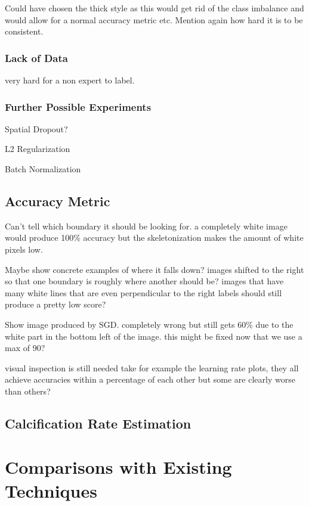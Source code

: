 Could have chosen the thick style as this would get rid of the class imbalance and would allow for a normal accuracy metric etc. Mention again how hard it is to be consistent.

\subsubsection{Lack of Data}

very hard for a non expert to label.

\subsubsection{Further Possible Experiments}

Spatial Dropout?

L2 Regularization

Batch Normalization

\subsection{Accuracy Metric}

Can't tell which boundary it should be looking for. a completely white image would produce 100\% accuracy but the skeletonization makes the amount of white pixels low.

Maybe show concrete examples of where it falls down? images shifted to the right so that one boundary is roughly where another should be? images that have many white lines that are even perpendicular to the right labels should still produce a pretty low score?

Show image produced by SGD. completely wrong but still gets 60\% due to the white part in the bottom left of the image. this might be fixed now that we use a max of 90?

visual inspection is still needed take for example the learning rate plots, they all achieve accuracies within a percentage of each other but some are clearly worse than others?

\subsection{Calcification Rate Estimation}

\section{Comparisons with Existing Techniques}

